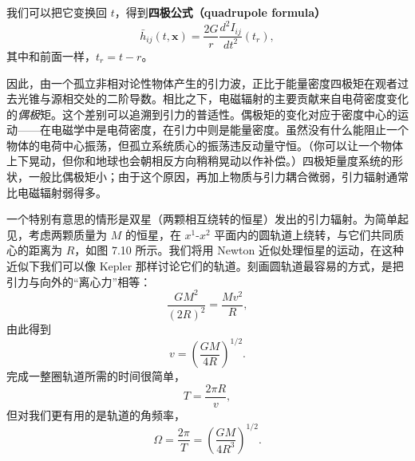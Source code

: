 
我们可以把它变换回 $t$，得到\textbf{四极公式（quadrupole formula）}
\begin{equation*}
\boxed{\,\bar{h}_{ij}(t, \mathbf{x}) = \frac{2G}{r}\frac{d^{2}I_{ij}}{dt^{2}}(t_r),\,}
\tag{7.140}
\end{equation*}
其中和前面一样，$t_r = t - r$。

因此，由一个孤立非相对论性物体产生的引力波，正比于能量密度四极矩在观者过去光锥与源相交处的二阶导数。相比之下，电磁辐射的主要贡献来自电荷密度变化的\emph{偶极}矩。这个差别可以追溯到引力的普适性。偶极矩的变化对应于密度中心的运动——在电磁学中是电荷密度，在引力中则是能量密度。虽然没有什么能阻止一个物体的电荷中心振荡，但孤立系统质心的振荡违反动量守恒。（你可以让一个物体上下晃动，但你和地球也会朝相反方向稍稍晃动以作补偿。）四极矩量度系统的形状，一般比偶极矩小；由于这个原因，再加上物质与引力耦合微弱，引力辐射通常比电磁辐射弱得多。

一个特别有意思的情形是双星（两颗相互绕转的恒星）发出的引力辐射。为简单起见，考虑两颗质量为 $M$ 的恒星，在 $x^{1}$-$x^{2}$ 平面内的圆轨道上绕转，与它们共同质心的距离为 $R$，如图 7.10 所示。我们将用 Newton 近似处理恒星的运动，在这种近似下我们可以像 Kepler 那样讨论它们的轨道。刻画圆轨道最容易的方式，是把引力与向外的“离心力”相等：
\begin{equation*}
\frac{GM^{2}}{(2R)^{2}} = \frac{Mv^{2}}{R},
\tag{7.141}
\end{equation*}
由此得到
\begin{equation*}
v = \left(\frac{GM}{4R}\right)^{1/2}.
\tag{7.142}
\end{equation*}
完成一整圈轨道所需的时间很简单，
\begin{equation*}
T = \frac{2\pi R}{v},
\tag{7.143}
\end{equation*}
但对我们更有用的是轨道的角频率，
\begin{equation*}
\Omega = \frac{2\pi}{T} = \left(\frac{GM}{4R^{3}}\right)^{1/2}.
\tag{7.144}
\end{equation*}



